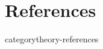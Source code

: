 \documentclass[preview]{standalone}
\begin{document}
\genpage

\nocite{*} %

\section{References}

\begin{snippet}{categorytheory-references}
    \printbibliography[heading=none]
\end{snippet}
\end{document}
